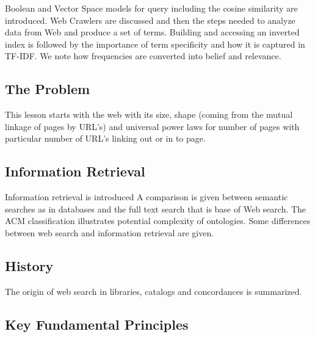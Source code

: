 Boolean and Vector Space models for query including the cosine
similarity are introduced. Web Crawlers are discussed and then the steps
needed to analyze data from Web and produce a set of terms. Building and
accessing an inverted index is followed by the importance of term
specificity and how it is captured in TF-IDF. We note how frequencies
are converted into belief and relevance.


\subsection{The Problem}


This lesson starts with the web with its size, shape (coming from the
mutual linkage of pages by URL's) and universal power laws for number of
pages with particular number of URL's linking out or in to page.



\subsection{Information Retrieval}


Information retrieval is introduced A comparison is given between
semantic searches as in databases and the full text search that is base
of Web search. The ACM classification illustrates potential complexity
of ontologies. Some differences between web search and information
retrieval are given.



\subsection{History}


The origin of web search in libraries, catalogs and concordances is
summarized.




\subsection{Key Fundamental Principles}

